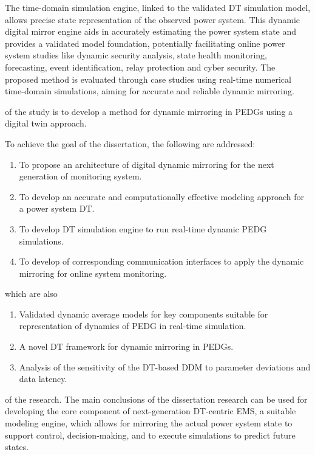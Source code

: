 The time-domain simulation engine, linked to the validated DT simulation model, allows precise state representation of the observed power system. This dynamic digital mirror engine aids in accurately estimating the power system state and provides a validated model foundation, potentially facilitating online power system studies like dynamic security analysis, state health monitoring, forecasting, event identification, relay protection and cyber security. The proposed method is evaluated through case studies using real-time numerical time-domain simulations, aiming for accurate and reliable dynamic mirroring.

{\aim} of the study is to develop a method for dynamic mirroring in PEDGs using a digital twin approach. 

To achieve the goal of the dissertation, the following {\tasks} are addressed:
\begin{enumerate}[beginpenalty=10000] %
  \item To propose an architecture of digital dynamic mirroring for the next generation of monitoring system.
  \item To develop an accurate and computationally effective modeling approach for a power system DT.
  \item To develop DT simulation engine to run real-time dynamic PEDG simulations.
  \item To develop of corresponding communication interfaces to apply the dynamic mirroring for online system monitoring.
\end{enumerate}


{\novelty} which are also {}
\begin{enumerate}[beginpenalty=10000] %
  \item Validated dynamic average models for key components suitable for representation of dynamics of PEDG in real-time simulation.
  \item A novel DT framework for dynamic mirroring in PEDGs.
  \item Analysis of the sensitivity of the DT-based DDM to parameter deviations and data latency.
\end{enumerate}

{\influence} of the research. The main conclusions of the dissertation research can be used for developing the core component of next-generation DT-centric EMS, a suitable modeling engine, which allows for mirroring the actual power system state to support control, decision-making, and to execute simulations to predict future states. 

